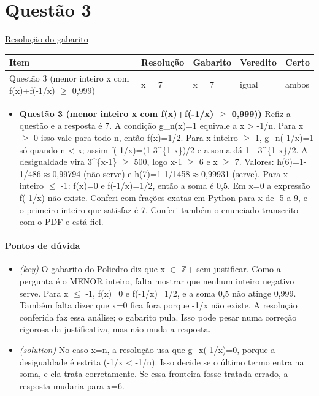 \documentclass{article}%
\begin{document}
\section*{Questão 3}%
\href{https://poliedroresolve.sistemapoliedro.com.br/vestibulares/ime/2027/ime-2-fase-dia-1-26-10-2026-2-fase-dia-1/dissertativa-3-matematica-2-fase-dia-1-ime-2027}{Resolução do gabarito}\par\smallskip%
\begin{longtable}{@{}p{} p{} p{} p{} p{}@{}}\toprule Item & Resolução & Gabarito & Veredito & Certo \\ \midrule
Questão 3 (menor inteiro x com f(x)+f(-1/x) $\geq$ 0,999) & x = 7 & x = 7 & igual & ambos \\
\bottomrule\end{longtable}%
\begin{itemize}%
\item%
\textbf{Questão 3 (menor inteiro x com f(x)+f(-1/x) $\geq$ 0,999))} Refiz a questão e a resposta é 7. A condição g\_n(x)=1 equivale a x > -1/n. Para x $\geq$ 0 isso vale para todo n, então f(x)=1/2. Para x inteiro $\geq$ 1, g\_n(-1/x)=1 só quando n < x; assim f(-1/x)=(1-3\^{}\{1-x\})/2 e a soma dá 1 - 3\^{}\{1-x\}/2. A desigualdade vira 3\^{}\{x-1\} $\geq$ 500, logo x-1 $\geq$ 6 e x $\geq$ 7. Valores: h(6)=1-1/486$\approx$0,99794 (não serve) e h(7)=1-1/1458$\approx$0,99931 (serve). Para x inteiro $\leq$ -1: f(x)=0 e f(-1/x)=1/2, então a soma é 0,5. Em x=0 a expressão f(-1/x) não existe. Conferi com frações exatas em Python para x de -5 a 9, e o primeiro inteiro que satisfaz é 7. Conferi também o enunciado transcrito com o PDF e está fiel.%
\end{itemize}%
\paragraph{Pontos de dúvida}%
\begin{itemize}%
\item%
\textit{(key)} O gabarito do Poliedro diz que x $\in$ $\mathbb{Z}$+ sem justificar. Como a pergunta é o MENOR inteiro, falta mostrar que nenhum inteiro negativo serve. Para x $\leq$ -1, f(x)=0 e f(-1/x)=1/2, e a soma 0,5 não atinge 0,999. Também falta dizer que x=0 fica fora porque -1/x não existe. A resolução conferida faz essa análise; o gabarito pula. Isso pode pesar numa correção rigorosa da justificativa, mas não muda a resposta.%
\item%
\textit{(solution)} No caso x=n, a resolução usa que g\_x(-1/x)=0, porque a desigualdade é estrita (-1/x < -1/n). Isso decide se o último termo entra na soma, e ela trata corretamente. Se essa fronteira fosse tratada errado, a resposta mudaria para x=6.%
\end{itemize}%
\end{document}

